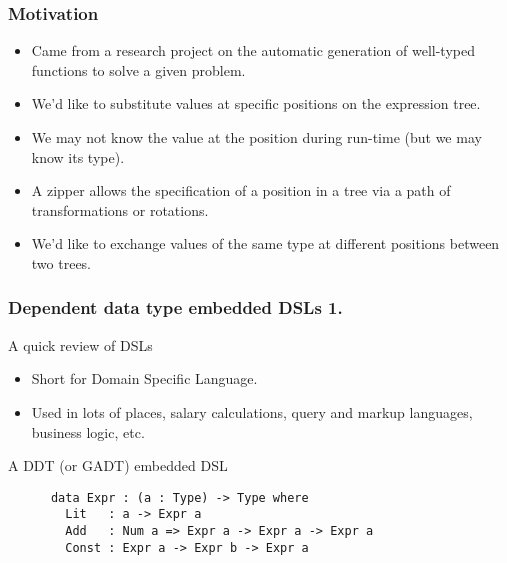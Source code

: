\documentclass{beamer}
\begin{document}
\begin{frame}[fragile]
  \frametitle{Motivation}
  \begin{itemize}
    \item Came from a research project on the automatic generation of 
      well-typed functions to solve a given problem.
    \item We'd like to substitute values at specific positions on
      the expression tree.
    \item We may not know the value at the position during run-time
      (but we may know its type).
    \item A zipper allows the specification of a position in a tree
      via a path of transformations or rotations.
    \item We'd like to exchange values of the same type at different
      positions between two trees.
  \end{itemize}
\end{frame}

\begin{frame}[fragile]
  \frametitle{Dependent data type embedded DSLs 1.}
  \begin{block}{A quick review of DSLs}
    \begin{itemize}
      \item Short for Domain Specific Language.
      \item Used in lots of places, salary calculations, query and
        markup languages, business logic, etc.
    \end{itemize}
  \end{block}
  \begin{block}{A DDT (or GADT) embedded DSL}
    \begin{verbatim}
      data Expr : (a : Type) -> Type where
        Lit   : a -> Expr a
        Add   : Num a => Expr a -> Expr a -> Expr a
        Const : Expr a -> Expr b -> Expr a
    \end{verbatim}
  \end{block}
\end{frame}
\end{document}

